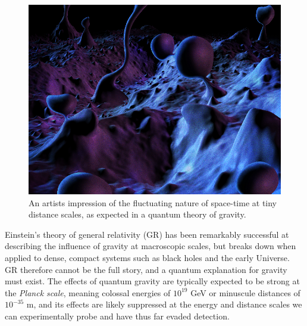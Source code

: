\documentclass[a4paper,11pt]{article}
\begin{document}

\begin{figure} %
    \centering
		\includegraphics[width=1.\linewidth]{images/quantum_foam_2.png}
		\caption{An artists impression of the fluctuating nature of space-time at tiny distance scales, as expected in a quantum theory of gravity.}
		\vspace{-7pt}
		\label{fig:spacetime_foam}
\end{figure}

Einstein's theory of general relativity (GR) has been remarkably successful at describing the influence of gravity at macroscopic scales, but breaks down when applied to dense, compact systems such as black holes and the early Universe. GR therefore cannot be the full story, and a quantum explanation for gravity must exist. The effects of quantum gravity are typically expected to be strong at the \textit{Planck scale}, meaning colossal energies of $10^{19}$ GeV or minuscule distances of $10^{-35}$ m, and its effects are likely suppressed at the energy and distance scales we can experimentally probe and have thus far evaded detection.
\end{document}
